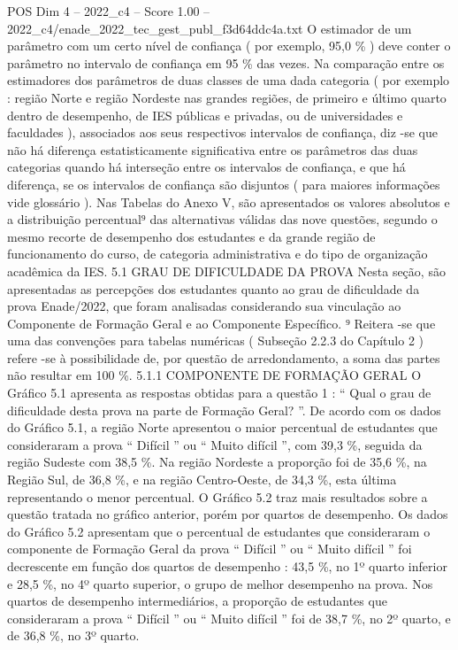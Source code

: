\begin{textsample}{POS Dim 4 – 2022\_c4 – Score 1.00 – 2022\_c4/enade\_2022\_tec\_gest\_publ\_f3d64ddc4a.txt}
O estimador de um parâmetro com um certo nível de confiança ( por exemplo, 95,0 \% ) deve conter o parâmetro no intervalo de confiança em 95 \% das vezes.
Na comparação entre os estimadores dos parâmetros de duas classes de uma dada categoria ( por exemplo : região Norte e região Nordeste nas grandes regiões, de primeiro e último quarto dentro de desempenho, de IES públicas e privadas, ou de universidades e faculdades ), associados aos seus respectivos intervalos de confiança, diz -se que não há diferença estatisticamente significativa entre os parâmetros das duas categorias quando há interseção entre os intervalos de confiança, e que há diferença, se os intervalos de confiança são disjuntos ( para maiores informações vide glossário ).
Nas Tabelas do Anexo V, são apresentados os valores absolutos e a distribuição percentual⁹ das alternativas válidas das nove questões, segundo o mesmo recorte de desempenho dos estudantes e da grande região de funcionamento do curso, de categoria administrativa e do tipo de organização acadêmica da IES. 5.1 GRAU DE DIFICULDADE DA PROVA Nesta seção, são apresentadas as percepções dos estudantes quanto ao grau de dificuldade da prova Enade/2022, que foram analisadas considerando sua vinculação ao Componente de Formação Geral e ao Componente Específico. ⁹ Reitera -se que uma das convenções para tabelas numéricas ( Subseção 2.2.3 do Capítulo 2 ) refere -se à possibilidade de, por questão de arredondamento, a soma das partes não resultar em 100 \%. 5.1.1 COMPONENTE DE FORMAÇÃO GERAL O Gráfico 5.1 apresenta as respostas obtidas para a questão 1 : “ Qual o grau de dificuldade desta prova na parte de Formação Geral? ”.
De acordo com os dados do Gráfico 5.1, a região Norte apresentou o maior percentual de estudantes que consideraram a prova “ Difícil ” ou “ Muito difícil ”, com 39,3 \%, seguida da região Sudeste com 38,5 \%.
Na região Nordeste a proporção foi de 35,6 \%, na Região Sul, de 36,8 \%, e na região Centro-Oeste, de 34,3 \%, esta última representando o menor percentual.
O Gráfico 5.2 traz mais resultados sobre a questão tratada no gráfico anterior, porém por quartos de desempenho.
Os dados do Gráfico 5.2 apresentam que o percentual de estudantes que consideraram o componente de Formação Geral da prova “ Difícil ” ou “ Muito difícil ” foi decrescente em função dos quartos de desempenho : 43,5 \%, no 1º quarto inferior e 28,5 \%, no 4º quarto superior, o grupo de melhor desempenho na prova.
Nos quartos de desempenho intermediários, a proporção de estudantes que consideraram a prova “ Difícil ” ou “ Muito difícil ” foi de 38,7 \%, no 2º quarto, e de 36,8 \%, no 3º quarto.

\end{textsample}
